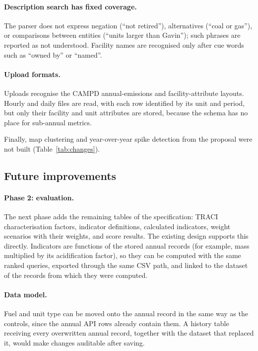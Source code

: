 \documentclass[11pt,a4paper]{article}
\begin{document}
\paragraph{Description search has fixed coverage.} The parser does not express negation (``not
retired''), alternatives (``coal or gas''), or comparisons between entities (``units larger than
Gavin''); such phrases are reported as not understood. Facility names are recognised only after
cue words such as ``owned by'' or ``named''.

\paragraph{Upload formats.} Uploads recognise the CAMPD annual-emissions and facility-attribute
layouts. Hourly and daily files are read, with each row identified by its unit and period, but
only their facility and unit attributes are stored, because the schema has no place for
sub-annual metrics.

Finally, map clustering and year-over-year spike detection from the proposal were not built
(Table~\ref{tab:changes}).

\subsection{Future improvements}

\paragraph{Phase 2: evaluation.} The next phase adds the remaining tables of the
specification: TRACI characterisation factors, indicator definitions, calculated indicators,
weight scenarios with their weights, and score results. The existing design supports this
directly. Indicators are functions of the stored annual records (for example, \SOtwo{} mass
multiplied by its acidification factor), so they can be computed with the same ranked queries,
exported through the same CSV path, and linked to the dataset of the records from which they
were computed.

\paragraph{Data model.} Fuel and unit type can be moved onto the annual record in the same way as
the controls, since the annual API rows already contain them. A history table receiving every
overwritten annual record, together with the dataset that replaced it, would make changes
auditable after saving.
\end{document}
